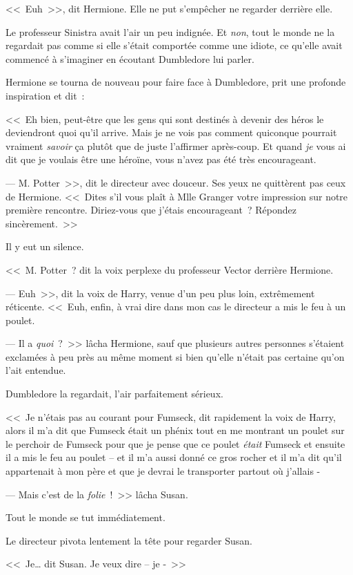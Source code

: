 <<~Euh~>>, dit Hermione. Elle ne put s'empêcher ne regarder derrière elle.

Le professeur Sinistra avait l'air un peu indignée. Et \emph{non}, tout le monde ne la regardait pas comme si elle s'était comportée comme une idiote, ce qu'elle avait commencé à s'imaginer en écoutant Dumbledore lui parler.

Hermione se tourna de nouveau pour faire face à Dumbledore, prit une profonde inspiration et dit~:

<<~Eh bien, peut-être que les gens qui sont destinés à devenir des héros le deviendront quoi qu'il arrive. Mais je ne vois pas comment quiconque pourrait vraiment \emph{savoir} ça plutôt que de juste l'affirmer après-coup. Et quand \emph{je} vous ai dit que je voulais être une héroïne, vous n'avez pas été très encourageant.

--- M. Potter~>>, dit le directeur avec douceur. Ses yeux ne quittèrent pas ceux de Hermione. <<~Dites s'il vous plaît à Mlle Granger votre impression sur notre première rencontre. Diriez-vous que j'étais encourageant~? Répondez sincèrement.~>>

Il y eut un silence.

<<~M. Potter~? dit la voix perplexe du professeur Vector derrière Hermione.

--- Euh~>>, dit la voix de Harry, venue d'un peu plus loin, extrêmement réticente. <<~Euh, enfin, à vrai dire dans mon cas le directeur a mis le feu à un poulet.

--- Il a \emph{quoi}~?~>> lâcha Hermione, sauf que plusieurs autres personnes s'étaient exclamées à peu près au même moment si bien qu'elle n'était pas certaine qu'on l'ait entendue.

Dumbledore la regardait, l'air parfaitement sérieux.

<<~Je n'étais pas au courant pour Fumseck, dit rapidement la voix de Harry, alors il m'a dit que Fumseck était un phénix tout en me montrant un poulet sur le perchoir de Fumseck pour que je pense que ce poulet \emph{était} Fumseck et ensuite il a mis le feu au poulet -- et il m'a aussi donné ce gros rocher et il m'a dit qu'il appartenait à mon père et que je devrai le transporter partout où j'allais -

--- Mais c'est de la \emph{folie}~!~>> lâcha Susan.

Tout le monde se tut immédiatement.

Le directeur pivota lentement la tête pour regarder Susan.

<<~Je… dit Susan. Je veux dire -- je -~>>

